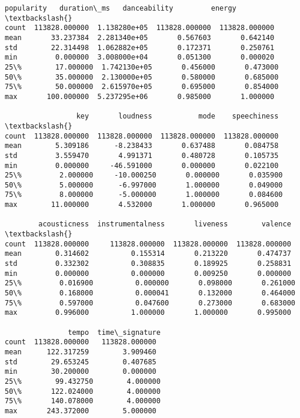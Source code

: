 \documentclass[11pt]{article}
\makeatletter
\newcommand{\boxspacing}{\kern\kvtcb@left@rule\kern\kvtcb@boxsep}
\newcommand{\prompt}[4]{
        {\ttfamily\llap{{\color{#2}[#3]:\hspace{3pt}#4}}\vspace{-\baselineskip}}
    }
\makeatother
\begin{document}
            \begin{tcolorbox}[breakable, size=fbox, boxrule=.5pt, pad at break*=1mm, opacityfill=0]
\prompt{Out}{outcolor}{67}{\boxspacing}
\begin{Verbatim}[commandchars=\\\{\}]
          popularity   duration\_ms   danceability         energy  \textbackslash{}
count  113828.000000  1.138280e+05  113828.000000  113828.000000
mean       33.237384  2.281340e+05       0.567603       0.642140
std        22.314498  1.062882e+05       0.172371       0.250761
min         0.000000  3.008000e+04       0.051300       0.000020
25\%        17.000000  1.742130e+05       0.456000       0.473000
50\%        35.000000  2.130000e+05       0.580000       0.685000
75\%        50.000000  2.615970e+05       0.695000       0.854000
max       100.000000  5.237295e+06       0.985000       1.000000

                 key       loudness           mode    speechiness  \textbackslash{}
count  113828.000000  113828.000000  113828.000000  113828.000000
mean        5.309186      -8.238433       0.637488       0.084758
std         3.559470       4.991371       0.480728       0.105735
min         0.000000     -46.591000       0.000000       0.022100
25\%         2.000000     -10.000250       0.000000       0.035900
50\%         5.000000      -6.997000       1.000000       0.049000
75\%         8.000000      -5.000000       1.000000       0.084600
max        11.000000       4.532000       1.000000       0.965000

        acousticness  instrumentalness       liveness        valence  \textbackslash{}
count  113828.000000     113828.000000  113828.000000  113828.000000
mean        0.314602          0.155314       0.213220       0.474737
std         0.332302          0.308835       0.189925       0.258831
min         0.000000          0.000000       0.009250       0.000000
25\%         0.016900          0.000000       0.098000       0.261000
50\%         0.168000          0.000041       0.132000       0.464000
75\%         0.597000          0.047600       0.273000       0.683000
max         0.996000          1.000000       1.000000       0.995000

               tempo  time\_signature
count  113828.000000   113828.000000
mean      122.317259        3.909460
std        29.653245        0.407685
min        30.200000        0.000000
25\%        99.432750        4.000000
50\%       122.024000        4.000000
75\%       140.078000        4.000000
max       243.372000        5.000000
\end{Verbatim}
\end{tcolorbox}
        
\end{document}
